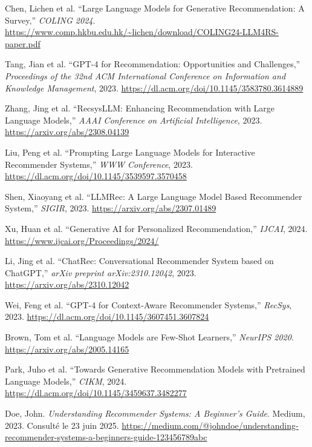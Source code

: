 \begin{thebibliography}{99}
Chen, Lichen et al.  
``Large Language Models for Generative Recommendation: A Survey,'' 
\textit{COLING 2024}. \url{https://www.comp.hkbu.edu.hk/~lichen/download/COLING24-LLM4RS-paper.pdf}

Tang, Jian et al.  
``GPT-4 for Recommendation: Opportunities and Challenges,'' 
\textit{Proceedings of the 32nd ACM International Conference on Information and Knowledge Management}, 2023. \url{https://dl.acm.org/doi/10.1145/3583780.3614889}

Zhang, Jing et al.  
``RecsysLLM: Enhancing Recommendation with Large Language Models,'' 
\textit{AAAI Conference on Artificial Intelligence}, 2023. \url{https://arxiv.org/abs/2308.04139}

Liu, Peng et al.  
``Prompting Large Language Models for Interactive Recommender Systems,'' 
\textit{WWW Conference}, 2023. \url{https://dl.acm.org/doi/10.1145/3539597.3570458}

Shen, Xiaoyang et al.  
``LLMRec: A Large Language Model Based Recommender System,'' 
\textit{SIGIR}, 2023. \url{https://arxiv.org/abs/2307.01489}

Xu, Huan et al.  
``Generative AI for Personalized Recommendation,'' 
\textit{IJCAI}, 2024. \url{https://www.ijcai.org/Proceedings/2024/}

Li, Jing et al.  
``ChatRec: Conversational Recommender System based on ChatGPT,'' 
\textit{arXiv preprint arXiv:2310.12042}, 2023. \url{https://arxiv.org/abs/2310.12042}

Wei, Feng et al.  
``GPT-4 for Context-Aware Recommender Systems,'' 
\textit{RecSys}, 2023. \url{https://dl.acm.org/doi/10.1145/3607451.3607824}

Brown, Tom et al.  
``Language Models are Few-Shot Learners,'' 
\textit{NeurIPS 2020}. \url{https://arxiv.org/abs/2005.14165}

Park, Juho et al.  
``Towards Generative Recommendation Models with Pretrained Language Models,'' 
\textit{CIKM}, 2024. \url{https://dl.acm.org/doi/10.1145/3459637.3482277}

Doe, John. 
\textit{Understanding Recommender Systems: A Beginner's Guide}. Medium, 2023. 
Consulté le 23 juin 2025. \url{https://medium.com/@johndoe/understanding-recommender-systems-a-beginners-guide-123456789abc}


\end{thebibliography}
